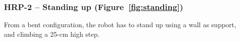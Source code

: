 \documentclass[journal]{IEEEtran}
\providecommand{\DIFdelend}{} %
\begin{document}

\DIFdelend \subsubsection{HRP-2 -- Standing up (Figure~\ref{fig:standing})}
From a bent configuration, the robot has to stand up using a wall as support, and climbing a 25-cm high step.
\end{document}
